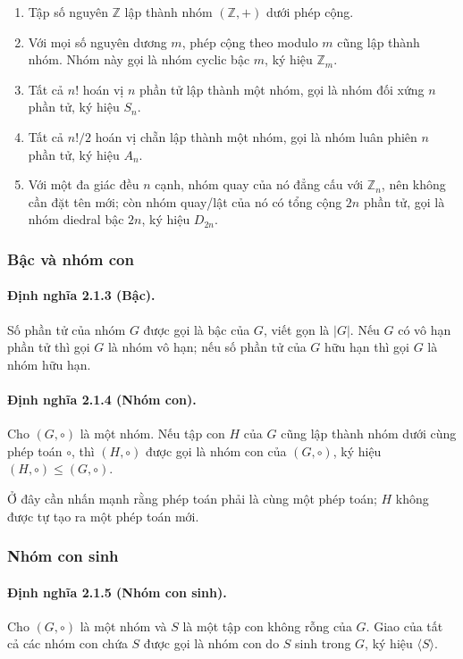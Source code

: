 \documentclass[11pt]{article}
\begin{document}
\begin{enumerate}
  \item Tập số nguyên \(\mathbb{Z}\) lập thành nhóm \((\mathbb{Z},+)\) dưới
  phép cộng.
  \item Với mọi số nguyên dương \(m\), phép cộng theo modulo \(m\) cũng lập
  thành nhóm. Nhóm này gọi là nhóm cyclic bậc \(m\), ký hiệu \(\mathbb{Z}_m\).
  \item Tất cả \(n!\) hoán vị \(n\) phần tử lập thành một nhóm, gọi là nhóm đối
  xứng \(n\) phần tử, ký hiệu \(S_n\).
  \item Tất cả \(n!/2\) hoán vị chẵn lập thành một nhóm, gọi là nhóm luân phiên
  \(n\) phần tử, ký hiệu \(A_n\).
  \item Với một đa giác đều \(n\) cạnh, nhóm quay của nó đẳng cấu với
  \(\mathbb{Z}_n\), nên không cần đặt tên mới; còn nhóm quay/lật của nó có
  tổng cộng \(2n\) phần tử, gọi là nhóm diedral bậc \(2n\), ký hiệu \(D_{2n}\).
\end{enumerate}

\subsubsection{Bậc và nhóm con}

\paragraph{Định nghĩa 2.1.3 (Bậc).}
Số phần tử của nhóm \(G\) được gọi là bậc của \(G\), viết gọn là \(|G|\). Nếu
\(G\) có vô hạn phần tử thì gọi \(G\) là nhóm vô hạn; nếu số phần tử của \(G\)
hữu hạn thì gọi \(G\) là nhóm hữu hạn.

\paragraph{Định nghĩa 2.1.4 (Nhóm con).}
Cho \((G,\circ)\) là một nhóm. Nếu tập con \(H\) của \(G\) cũng lập thành nhóm
dưới cùng phép toán \(\circ\), thì \((H,\circ)\) được gọi là nhóm con của
\((G,\circ)\), ký hiệu \((H,\circ)\le (G,\circ)\).

Ở đây cần nhấn mạnh rằng phép toán phải là cùng một phép toán; \(H\) không được
tự tạo ra một phép toán mới.

\subsubsection{Nhóm con sinh}

\paragraph{Định nghĩa 2.1.5 (Nhóm con sinh).}
Cho \((G,\circ)\) là một nhóm và \(S\) là một tập con không rỗng của \(G\). Giao
của tất cả các nhóm con chứa \(S\) được gọi là nhóm con do \(S\) sinh trong
\(G\), ký hiệu \(\langle S\rangle\).
\end{document}
